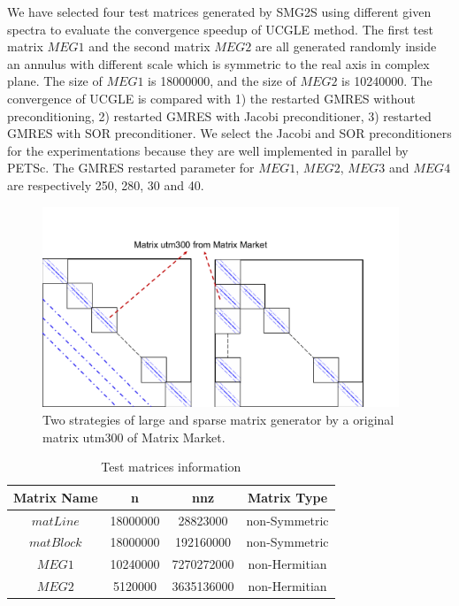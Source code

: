 We have selected four test matrices generated by SMG2S using different given spectra to evaluate the convergence speedup of UCGLE method. The first test matrix $MEG1$ and the second matrix $MEG2$ are all generated randomly inside an annulus with different scale which is symmetric to the real axis in complex plane. The size of $MEG1$ is \num[round-precision=2,round-mode=figures]{18000000}, and the size of $MEG2$ is \num[round-precision=4,round-mode=figures]{10240000}. The convergence of UCGLE is compared with 1) the restarted GMRES without preconditioning, 2) restarted GMRES with Jacobi preconditioner, 3) restarted GMRES with SOR preconditioner. We select the Jacobi and SOR preconditioners for the experimentations because they are well implemented in parallel by PETSc. The GMRES restarted parameter for $MEG1$, $MEG2$, $MEG3$ and $MEG4$ are respectively 250, 280, 30 and 40.

\begin{figure}[htbp]
	\centering
	\includegraphics[width=4.2in]{fig/matrix_generator.pdf}
	\caption{Two strategies of large and sparse matrix generator by a original matrix utm300 of Matrix Market.}
	\label{fig:matrix}
\end{figure}


\begin{table}[!t]
	\renewcommand{\arraystretch}{1.2}
	\caption{Test matrices information}
	\label{matget}
	\centering
	\begin{tabular}{|c|c|c|c|}
		\hline
		Matrix Name& n & nnz & Matrix Type\\
		\hline
		$matLine$  & \num[round-precision=2,round-mode=figures]{18000000} & \num[round-precision=2,round-mode=figures]{28823000} & non-Symmetric\\
		\hline
		$matBlock$  & \num[round-precision=2,round-mode=figures]{18000000} & \num[round-precision=2,round-mode=figures]{192160000} & non-Symmetric\\
		\hline
		$MEG1$ & \num[round-precision=4,round-mode=figures]{10240000} & \num[round-mode = places, scientific-notation = fixed, fixed-exponent = 9,round-precision = 2]{7270272000} & non-Hermitian\\
		\hline
		$MEG2$ & \num[round-precision=2,round-mode=figures]{5120000} & \num[round-mode = places, scientific-notation = fixed, fixed-exponent = 9,round-precision = 2]{3635136000} & non-Hermitian\\
		\hline
	\end{tabular}
\end{table}


